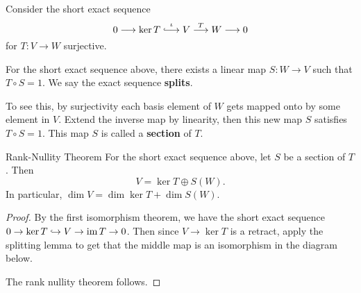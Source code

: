 Consider the short exact sequence \[
0 \longrightarrow \ker T \overset{\iota}{\lhook\joinrel\longrightarrow}  V \overset{T}{\longrightarrow} W \longrightarrow 0
\] for $T \colon V \to W$ surjective.
\begin{theorem}
    For the short exact sequence above, there exists a linear map $S \colon W \to V$ such that $T \circ S=1$. We say the exact sequence \textbf{splits}.
\end{theorem}
To see this, by surjectivity each basis element of $W$ gets mapped onto by some element in $V$. Extend the inverse map by linearity, then this new map $S$ satisfies $T \circ S=1$. This map $S$ is called a \textbf{section} of $T$.
\begin{namedthm}{Rank-Nullity Theorem} 
    For the short exact sequence above, let $S$ be a section of $T$. Then \[
        V=\ker T \oplus S(W).
    \] In particular, $\dim V=\dim \ker T+\dim S(W)$.
\end{namedthm}
\begin{proof}
    By the first isomorphism theorem, we have the short exact sequence $0 \to \ker T \hookrightarrow V \to \operatorname{im} T \to 0$. Then since $V\to \ker T$ is a retract, apply the splitting lemma to get that the middle map is an isomorphism in the diagram below. 
    \begin{figure}[H]
    \centering
    \end{figure}The rank nullity theorem follows. 
\end{proof}

